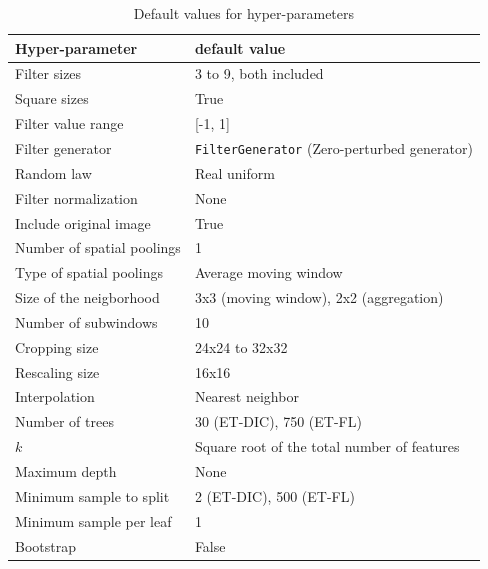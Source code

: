 \documentclass[a4paper]{report}
\begin{document}
	\begin{table}
		\centering
			\begin{tabular}{l|l}
			\hline
			Hyper-parameter & default value \\
			\hline
			Filter sizes & 3 to 9, both included\\
			Square sizes & True \\
			Filter value range & [-1, 1] \\
			Filter generator & \texttt{FilterGenerator} (Zero-perturbed generator)\\
			Random law & Real uniform\\
			Filter normalization & None\\
			Include original image & True\\
			Number of spatial poolings & 1 \\
			Type of spatial poolings & Average moving window \\
			Size of the neigborhood & 3x3 (moving window), 2x2 (aggregation)\\
			Number of subwindows & 10 \\
			Cropping size & 24x24 to 32x32 \\
			Rescaling size & 16x16 \\
			Interpolation & Nearest neighbor \\
			Number of trees & 30 (ET-DIC), 750 (ET-FL) \\
			$k$ & Square root of the total number of features \\
			Maximum depth & None \\
			Minimum sample to split & 2 (ET-DIC), 500 (ET-FL) \\
			Minimum sample per leaf & 1 \\
			Bootstrap & False \\
			\hline
			\end{tabular}
		\caption{Default values for hyper-parameters}
		\label{tab:DefaultValuesForHyperParameters}
	\end{table}
		

		
\end{document}
